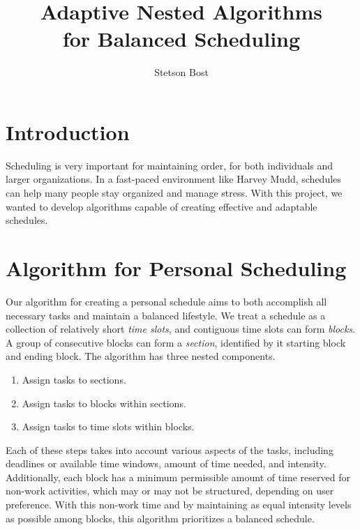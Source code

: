 \documentclass[thesis]{hmcposter}
\author{Stetson Bost}
\title{Adaptive Nested Algorithms\\for Balanced Scheduling}
\begin{document}
\begin{poster}

\section{Introduction}
Scheduling is very important for maintaining order, for both individuals and larger organizations.
In a fast-paced environment like Harvey Mudd, schedules can help many people stay organized and manage stress.
With this project, we wanted to develop algorithms capable of creating effective and adaptable schedules.

\section{Algorithm for Personal Scheduling}%
Our algorithm for creating a personal schedule aims to both accomplish all necessary tasks and maintain a balanced lifestyle.
We treat a schedule as a collection of relatively short \emph{time slots}, and contiguous time slots can form \emph{blocks}.
A group of consecutive blocks can form a \emph{section}, identified by it starting block and ending block.
The algorithm has three nested components.
\begin{enumerate}
	\item
		Assign tasks to sections.
	\item
		Assign tasks to blocks within sections. 
	\item
		Assign tasks to time slots within blocks.
\end{enumerate}
Each of these steps takes into account various aspects of the tasks, including deadlines or available time windows, amount of time needed, and intensity. Additionally, each block has a minimum permissible amount of time reserved for non-work activities, which may or may not be structured, depending on user preference.
With this non-work time and by maintaining as equal intensity levels as possible among blocks, this algorithm prioritizes a balanced schedule.


\end{poster}
\end{document}
